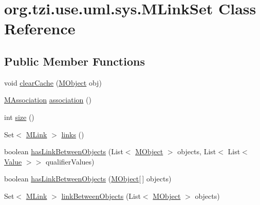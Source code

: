 \hypertarget{classorg_1_1tzi_1_1use_1_1uml_1_1sys_1_1_m_link_set}{\section{org.\-tzi.\-use.\-uml.\-sys.\-M\-Link\-Set Class Reference}
\label{classorg_1_1tzi_1_1use_1_1uml_1_1sys_1_1_m_link_set}
}
\subsection*{Public Member Functions}
\begin{DoxyCompactItemize}
\item 
void \hyperlink{classorg_1_1tzi_1_1use_1_1uml_1_1sys_1_1_m_link_set_a3743e06ce7b4c39c23eb4f11ff024d03}{clear\-Cache} (\hyperlink{interfaceorg_1_1tzi_1_1use_1_1uml_1_1sys_1_1_m_object}{M\-Object} obj)
\item 
\hyperlink{interfaceorg_1_1tzi_1_1use_1_1uml_1_1mm_1_1_m_association}{M\-Association} \hyperlink{classorg_1_1tzi_1_1use_1_1uml_1_1sys_1_1_m_link_set_a338612729b5faca0e8b74dff20c035ce}{association} ()
\item 
int \hyperlink{classorg_1_1tzi_1_1use_1_1uml_1_1sys_1_1_m_link_set_a6edd7e5eb5203cd5369351f6b8b76702}{size} ()
\item 
Set$<$ \hyperlink{interfaceorg_1_1tzi_1_1use_1_1uml_1_1sys_1_1_m_link}{M\-Link} $>$ \hyperlink{classorg_1_1tzi_1_1use_1_1uml_1_1sys_1_1_m_link_set_a13dcbf8aa3a30fd595fa1599c02fe01a}{links} ()
\item 
boolean \hyperlink{classorg_1_1tzi_1_1use_1_1uml_1_1sys_1_1_m_link_set_af5bbd23047871e2755234c50912aaa28}{has\-Link\-Between\-Objects} (List$<$ \hyperlink{interfaceorg_1_1tzi_1_1use_1_1uml_1_1sys_1_1_m_object}{M\-Object} $>$ objects, List$<$ List$<$ \hyperlink{classorg_1_1tzi_1_1use_1_1uml_1_1ocl_1_1value_1_1_value}{Value} $>$$>$ qualifier\-Values)
\item 
boolean \hyperlink{classorg_1_1tzi_1_1use_1_1uml_1_1sys_1_1_m_link_set_a8d47854ee33adffd85e193f61d1999a0}{has\-Link\-Between\-Objects} (\hyperlink{interfaceorg_1_1tzi_1_1use_1_1uml_1_1sys_1_1_m_object}{M\-Object}\mbox{[}$\,$\mbox{]} objects)
\item 
Set$<$ \hyperlink{interfaceorg_1_1tzi_1_1use_1_1uml_1_1sys_1_1_m_link}{M\-Link} $>$ \hyperlink{classorg_1_1tzi_1_1use_1_1uml_1_1sys_1_1_m_link_set_ab0a11ca10af9fbbf2132ece52d046eb2}{link\-Between\-Objects} (List$<$ \hyperlink{interfaceorg_1_1tzi_1_1use_1_1uml_1_1sys_1_1_m_object}{M\-Object} $>$ objects)
$$
\end{DoxyCompactItemize}
